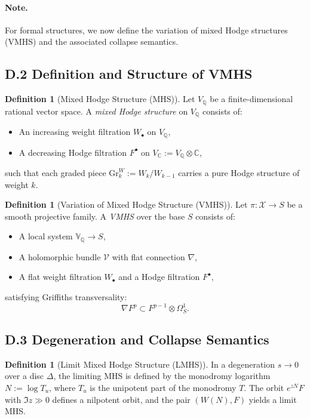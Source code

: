 \documentclass[11pt]{article}
\theoremstyle{definition}
\newtheorem{definition}[theorem]{Definition}
\begin{document}
\paragraph{Note.} For formal structures, we now define the variation of mixed Hodge structures (VMHS) and the associated collapse semantics.

\subsection*{D.2 Definition and Structure of VMHS}

\begin{definition}[Mixed Hodge Structure (MHS)]
Let \( V_{\mathbb{Q}} \) be a finite-dimensional rational vector space. A \emph{mixed Hodge structure} on \( V_{\mathbb{Q}} \) consists of:
\begin{itemize}
    \item An increasing weight filtration \( W_\bullet \) on \( V_{\mathbb{Q}} \),
    \item A decreasing Hodge filtration \( F^\bullet \) on \( V_{\mathbb{C}} := V_{\mathbb{Q}} \otimes \mathbb{C} \),
\end{itemize}
such that each graded piece \( \mathrm{Gr}^W_k := W_k / W_{k-1} \) carries a pure Hodge structure of weight \( k \).
\end{definition}

\begin{definition}[Variation of Mixed Hodge Structure (VMHS)]
Let \( \pi : \mathcal{X} \to S \) be a smooth projective family. A \emph{VMHS} over the base \( S \) consists of:
\begin{itemize}
    \item A local system \( \mathbb{V}_{\mathbb{Q}} \to S \),
    \item A holomorphic bundle \( \mathcal{V} \) with flat connection \( \nabla \),
    \item A flat weight filtration \( W_\bullet \) and a Hodge filtration \( F^\bullet \),
\end{itemize}
satisfying Griffiths transversality:
\[
\nabla F^p \subset F^{p-1} \otimes \Omega^1_S.
\]
\end{definition}

\subsection*{D.3 Degeneration and Collapse Semantics}

\begin{definition}[Limit Mixed Hodge Structure (LMHS)]
In a degeneration \( s \to 0 \) over a disc \( \Delta \), the limiting MHS is defined by the monodromy logarithm \( N := \log T_u \), where \( T_u \) is the unipotent part of the monodromy \( T \). The orbit \( e^{zN} F \) with \( \Im z \gg 0 \) defines a nilpotent orbit, and the pair \( (W(N), F) \) yields a limit MHS.
\end{definition}
\end{document}
